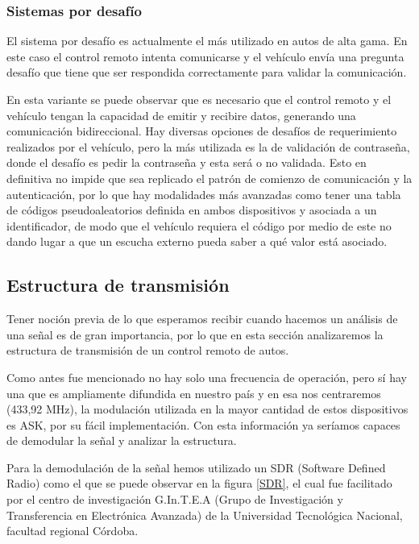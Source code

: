 \subsubsection{Sistemas por desafío}

El sistema por desafío es actualmente el más utilizado en autos de alta gama. En este caso el control remoto intenta comunicarse y
el vehículo envía una pregunta desafío que tiene que ser respondida correctamente para validar la comunicación.\par
En esta variante se puede observar que es necesario que el control remoto y el vehículo tengan la capacidad de
emitir y recibire datos, generando una comunicación bidireccional.
Hay diversas opciones de desafíos de requerimiento realizados por el vehículo, pero la más utilizada es la de validación de contraseña, donde el desafío es pedir la contraseña y esta será o no validada. Esto en definitiva no impide que sea replicado el patrón de comienzo de comunicación y 
la autenticación, por lo que hay modalidades más avanzadas como tener una tabla de códigos pseudoaleatorios definida en ambos dispositivos
y asociada a un identificador, de modo que el vehículo requiera el código por medio de este no dando lugar a que un escucha externo pueda saber
a qué valor está asociado.

\subsection{Estructura de transmisión} \label{cap:estructuratransmision}

Tener noción previa de lo que esperamos recibir cuando hacemos un análisis de una señal es de gran importancia, por lo que en esta sección 
analizaremos la estructura de transmisión de un control remoto de autos.\par
Como antes fue mencionado no hay solo una frecuencia de operación, pero sí hay una que es ampliamente difundida en nuestro país y en esa nos 
centraremos (433,92 MHz), la modulación utilizada en la mayor cantidad de estos dispositivos es ASK, por su fácil implementación. Con esta
información ya seríamos capaces de demodular la señal y analizar la estructura.\par 
Para la demodulación de la señal hemos utilizado un SDR (Software Defined Radio) como el que se puede observar en la figura \ref{SDR}, el cual
fue facilitado por el centro de investigación G.In.T.E.A (Grupo de Investigación y Transferencia en Electrónica Avanzada) de la Universidad
Tecnológica Nacional, facultad regional Córdoba.\par

